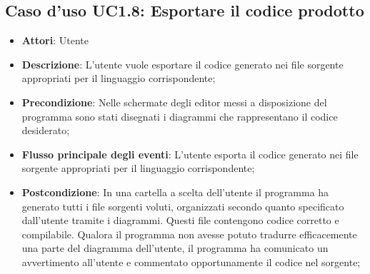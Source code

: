 \documentclass[../AnalisiDeiRequisiti.tex]{subfiles}
\begin{document}
	\subsection{Caso d'uso UC1.8: Esportare il codice prodotto}
	\begin{itemize}
		\item \textbf{Attori}: Utente
		\item \textbf{Descrizione}: L'utente vuole esportare il codice generato nei file sorgente appropriati per il linguaggio corrispondente;
		\item \textbf{Precondizione}: Nelle schermate degli editor messi a disposizione del programma sono stati disegnati i diagrammi che rappresentano il codice desiderato;
		\item \textbf{Flusso principale degli eventi}: L'utente esporta il codice generato nei file sorgente appropriati per il linguaggio corrispondente;
		\item \textbf{Postcondizione}: In una cartella a scelta dell'utente il programma ha generato tutti i file sorgenti voluti, organizzati secondo quanto specificato dall'utente tramite i diagrammi. Questi file contengono codice corretto e compilabile. Qualora il programma non avesse potuto tradurre efficacemente una parte del diagramma dell'utente, il programma ha comunicato un avvertimento all'utente e commentato opportunamente il codice nel sorgente;
	\end{itemize}
\end{document}
